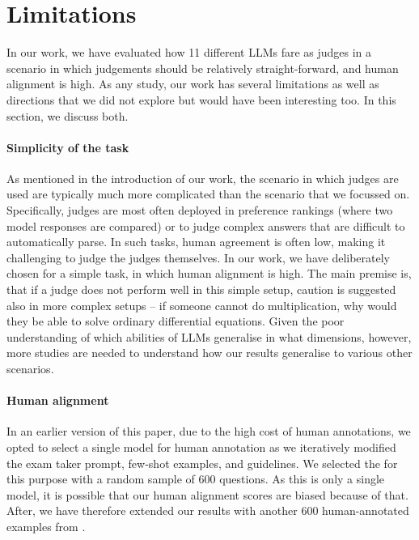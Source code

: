 \section{Limitations}\label{app:limitations}

In our work, we have evaluated how 11 different LLMs fare as judges in a scenario in which judgements should be relatively straight-forward, and human alignment is high.
As any study, our work has several limitations as well as directions that we did not explore but would have been interesting too.
In this section, we discuss both.

\paragraph{Simplicity of the task}
As mentioned in the introduction of our work, the scenario in which judges are used are typically much more complicated than the scenario that we focussed on.
Specifically, judges are most often deployed in preference rankings (where two model responses are compared) or to judge complex answers that are difficult to automatically parse.
In such tasks, human agreement is often low, making it challenging to judge the judges themselves.
In our work, we have deliberately chosen for a simple task, in which human alignment is high.
The main premise is, that if a judge does not perform well in this simple setup, caution is suggested also in more complex setups -- if someone cannot do multiplication, why would they be able to solve ordinary differential equations.
Given the poor understanding of which abilities of LLMs generalise in what dimensions, however, more studies are needed to understand how our results generalise to various other scenarios.

\paragraph{Human alignment}
In an earlier version of this paper, due to the high cost of human annotations, we opted to select a single model for human annotation as we iteratively modified the exam taker prompt, few-shot examples, and guidelines. 
We selected the  for this purpose with a random sample of 600 questions.
As this is only a single model, it is possible that our human alignment scores are biased because of that.
After, we have therefore extended our results with another 600 human-annotated examples from .

